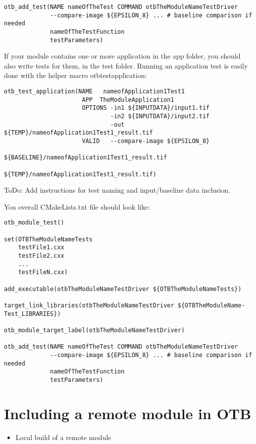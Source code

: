 \begin{verbatim}
otb_add_test(NAME nameOfTheTest COMMAND otbTheModuleNameTestDriver
             --compare-image ${EPSILON_8} ... # baseline comparison if needed
             nameOfTheTestFunction
             testParameters)
\end{verbatim}

If your module contains one or more application in the app folder, you should also write tests for them, in the test folder. Running an application test is easily done with the helper macro otb\textunderscore test\textunderscore application: 

\begin{verbatim}
otb_test_application(NAME   nameofApplication1Test1
                      APP  TheModuleApplication1
                      OPTIONS -in1 ${INPUTDATA}/input1.tif
                              -in2 ${INPUTDATA}/input2.tif
                              -out ${TEMP}/nameofApplication1Test1_result.tif
                      VALID   --compare-image ${EPSILON_8}
                              ${BASELINE}/nameofApplication1Test1_result.tif
                              ${TEMP}/nameofApplication1Test1_result.tif)
\end{verbatim}

ToDo: Add instructions for test naming and input/baseline data inclusion.

You overall CMakeLists.txt file should look like: 

\begin{verbatim}
otb_module_test()

set(OTBTheModuleNameTests
    testFile1.cxx
    testFile2.cxx
    ...
    testFileN.cxx)

add_executable(otbTheModuleNameTestDriver ${OTBTheModuleNameTests})

target_link_libraries(otbTheModuleNameTestDriver ${OTBTheModuleName-Test_LIBRARIES})
 
otb_module_target_label(otbTheModuleNameTestDriver)

otb_add_test(NAME nameOfTheTest COMMAND otbTheModuleNameTestDriver
             --compare-image ${EPSILON_8} ... # baseline comparison if needed
             nameOfTheTestFunction
             testParameters)
\end{verbatim}

\section{Including a remote module in OTB  }
\begin{itemize}
       \item Local build of a remote module  
\end{itemize}

